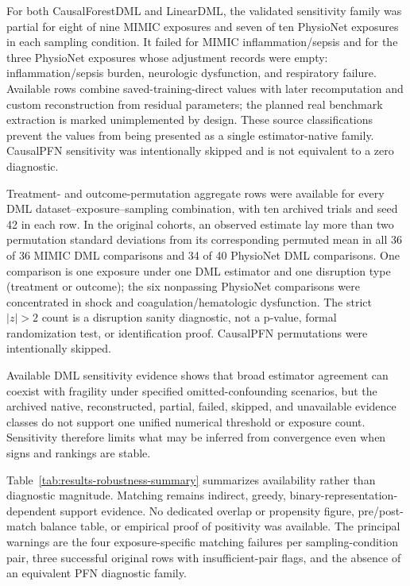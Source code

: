 For both CausalForestDML and LinearDML, the validated sensitivity family was partial for eight of nine MIMIC exposures and seven of ten PhysioNet exposures in each sampling condition.  It failed for MIMIC inflammation/sepsis and for the three PhysioNet exposures whose adjustment records were empty: inflammation/sepsis burden, neurologic dysfunction, and respiratory failure.  Available rows combine saved-training-direct values with later recomputation and custom reconstruction from residual parameters; the planned real benchmark extraction is marked unimplemented by design.  These source classifications prevent the values from being presented as a single estimator-native family.  CausalPFN sensitivity was intentionally skipped and is not equivalent to a zero diagnostic.

Treatment- and outcome-permutation aggregate rows were available for every DML dataset--exposure--sampling combination, with ten archived trials and seed 42 in each row.  In the original cohorts, an observed estimate lay more than two permutation standard deviations from its corresponding permuted mean in all 36 of 36 MIMIC DML comparisons and 34 of 40 PhysioNet DML comparisons.  One comparison is one exposure under one DML estimator and one disruption type (treatment or outcome); the six nonpassing PhysioNet comparisons were concentrated in shock and coagulation/hematologic dysfunction.  The strict $\lvert z\rvert>2$ count is a disruption sanity diagnostic, not a p-value, formal randomization test, or identification proof.  CausalPFN permutations were intentionally skipped.

Available DML sensitivity evidence shows that broad estimator agreement can coexist with fragility under specified omitted-confounding scenarios, but the archived native, reconstructed, partial, failed, skipped, and unavailable evidence classes do not support one unified numerical threshold or exposure count.  Sensitivity therefore limits what may be inferred from convergence even when signs and rankings are stable.

Table~\ref{tab:results-robustness-summary} summarizes availability rather than diagnostic magnitude.  Matching remains indirect, greedy, binary-representation-dependent support evidence.  No dedicated overlap or propensity figure, pre/post-match balance table, or empirical proof of positivity was available.  The principal warnings are the four exposure-specific matching failures per sampling-condition pair, three successful original rows with insufficient-pair flags, and the absence of an equivalent PFN diagnostic family.

